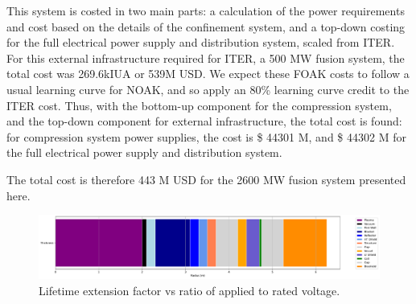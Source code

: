 
This system is costed in two main parts: a calculation of the power requirements and cost based on the details of the confinement system, and a top-down costing for the full electrical power supply and distribution system, scaled from ITER. For this external infrastructure required for ITER, a 500 MW fusion system, the total cost was 269.6kIUA or 539M USD. 
We expect these FOAK costs to follow a usual learning curve for NOAK, and so apply an 80\% learning curve credit to the ITER cost. Thus, with the bottom-up component for the compression system, and the top-down component for external infrastructure, the total cost is found: for compression system power supplies, the cost is \$ 44301 M, and \$ 44302 M for the full electrical power supply and distribution system. 

The total cost is therefore 443 M USD for the 2600 MW fusion system presented here. 

\begin{figure}[h!]
    \centering
    \includegraphics[scale=0.4]{Figures/cap_derate.pdf}
    \caption{Lifetime extension factor vs ratio of applied to rated voltage.}
    \label{fig:derate}
\end{figure}



